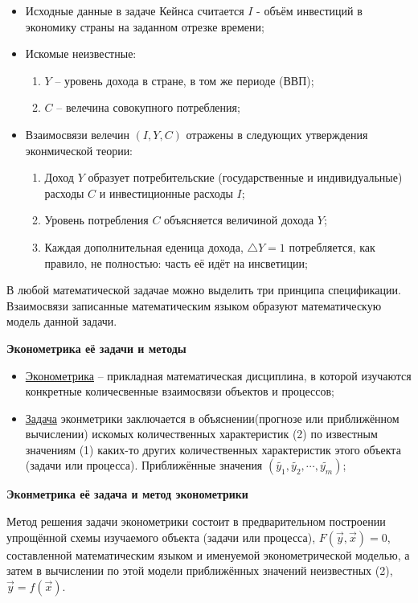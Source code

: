 \documentclass[12pt,a4paper]{article}
\begin{document}
\begin{itemize}
\item Исходные данные в задаче Кейнса считается $I$ - объём инвестиций в экономику страны на заданном отрезке времени;
\item Искомые неизвестные:
\begin{enumerate}
\item $Y$ -- уровень дохода в стране, в том же периоде (ВВП);
\item $C$ -- велечина совокупного потребления;
\end{enumerate}
\item Взаимосвязи велечин $(I, Y, C)$ отражены в следующих утверждения эконмической теории:
\begin{enumerate}
\item Доход $Y$ образует потребительские (государственные и индивидуальные) расходы $C$ и инвестиционные расходы $I$;
\item Уровень потребления $C$ объясняется величиной дохода $Y$;
\item Каждая дополнительная еденица дохода, $\triangle Y = 1$ потребляется, как правило, не полностью: часть её идёт на инсветиции;
\end{enumerate}
\end{itemize}

В любой математической задачае можно выделить три принципа спецификации. Взаимосвязи записанные математическим языком образуют математическую модель данной задачи.

\textbf{Эконометрика её задачи и методы}

\begin{itemize}
\item \underline{Эконометрика} -- прикладная математическая дисциплина, в которой изучаются конкретные количесвенные взаимосвязи объектов и процессов;
\item \underline{Задача} эконметрики заключается в объяснении(прогнозе или приближённом вычислении) искомых количественных характеристик (2) по известным значениям (1) каких-то других количественных характеристик этого объекта (задачи или процесса). Приближённые значения $(\widetilde{y_1}, \widetilde{y_2}, \cdots, \widetilde{y_m})$;
\end{itemize}

\textbf{Эконметрика её задача и метод эконометрики}

Метод решения задачи эконометрики состоит в предварительном построении упрощённой схемы изучаемого объекта (задачи или процесса), $F(\vec{y}, \vec{x}) = 0$, составленной математическим языком и именуемой эконометрической моделью, а затем в вычислении по этой модели приближённых значений неизвестных (2), $\vec{y} = f(\vec{x})$.
\end{document}
